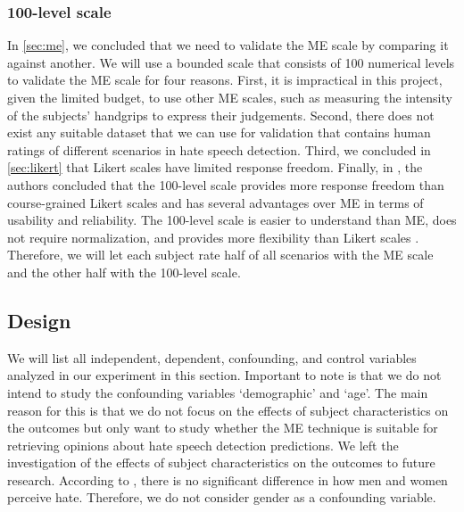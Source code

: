 \documentclass[a4paper]{article}
\begin{document}
\subsubsection{100-level scale}
In \ref{sec:me}, we concluded that we need to validate the ME scale by comparing it against another. We will use a bounded scale that consists of 100 numerical levels to validate the ME scale for four reasons. First, it is impractical in this project, given the limited budget, to use other ME scales, such as measuring the intensity of the subjects' handgrips to express their judgements. Second, there does not exist any suitable dataset that we can use for validation that contains human ratings of different scenarios in hate speech detection. Third, we concluded in \ref{sec:likert} that Likert scales have limited response freedom. Finally, in \cite{roitero2018fine}, the authors concluded that the 100-level scale provides more response freedom than course-grained Likert scales and has several advantages over ME in terms of usability and reliability. The 100-level scale is easier to understand than ME, does not require normalization, and provides more flexibility than Likert scales \cite{roitero2018fine}. Therefore, we will let each subject rate half of all scenarios with the ME scale and the other half with the 100-level scale.

\subsection{Design}
We will list all independent, dependent, confounding, and control variables analyzed in our experiment in this section. Important to note is that we do not intend to study the confounding variables ‘demographic’ and ‘age’. The main reason for this is that we do not focus on the effects of subject characteristics on the outcomes but only want to study whether the ME technique is suitable for retrieving opinions about hate speech detection predictions. We left the investigation of the effects of subject characteristics on the outcomes to future research. According to \cite{gold2018women}, there is no significant difference in how men and women perceive hate. Therefore, we do not consider gender as a confounding variable.
\end{document}
